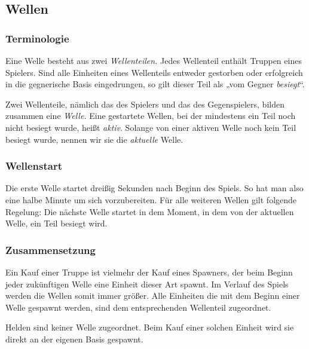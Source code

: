 \subsection{Wellen}

\subsubsection{Terminologie}

Eine Welle besteht aus zwei \emph{Wellenteilen.} Jedes Wellenteil enthält
Truppen eines Spielers.  Sind alle Einheiten eines Wellenteils entweder
gestorben oder erfolgreich in die gegnerische Basis eingedrungen, so gilt
dieser Teil als „vom Gegner \emph{besiegt}“.

Zwei Wellenteile, nämlich das des Spielers und das des Gegenspielers, bilden
zusammen eine \emph{Welle.} Eine gestartete Wellen, bei der mindestens ein Teil
noch nicht besiegt wurde, heißt \emph{aktiv}.
Solange von einer aktiven Welle noch kein Teil besiegt wurde, nennen wir sie die \emph{aktuelle} Welle.


\subsubsection{Wellenstart}

Die erste Welle startet dreißig Sekunden nach Beginn des Spiels. So hat man also eine halbe Minute um sich vorzubereiten.
Für alle weiteren Wellen gilt folgende Regelung: Die nächste Welle startet in dem Moment, in dem von der aktuellen Welle, ein Teil besiegt wird.


\subsubsection{Zusammensetzung}

Ein Kauf einer Truppe ist vielmehr der Kauf eines Spawners, der beim Beginn
jeder zukünftigen Welle eine Einheit dieser Art spawnt. Im Verlauf des Spiels
werden die Wellen somit immer größer. Alle Einheiten die mit dem Beginn einer
Welle gespawnt werden, sind dem entsprechenden Wellenteil zugeordnet.

Helden sind keiner Welle zugeordnet. Beim Kauf einer solchen Einheit wird sie
direkt an der eigenen Basis gespawnt.

